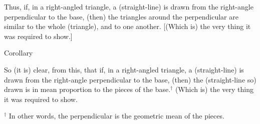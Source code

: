 \begin{Parallel}{}{}
{ Thus,  if, in a right-angled triangle, a (straight-line) is drawn from the right-angle perpendicular
to the base,  (then) the triangles around the perpendicular are similar to
the whole (triangle), and to one another. [(Which is) the very thing it
was required to show.]\\

\begin{center}
{\large Corollary}
\end{center}\vspace*{-7pt}

So (it is) clear, from this, that if, in a right-angled triangle, a
(straight-line) is drawn from the right-angle perpendicular to the base, (then) the (straight-line so)
drawn is in mean proportion to the pieces of the base.$^\dag$ (Which
is) the very thing it was required to show.}
\end{Parallel}
{\footnotesize \noindent$^\dag$ In other words, the perpendicular is the geometric mean of the pieces.} 

